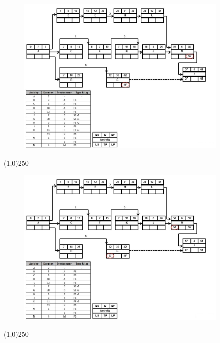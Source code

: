 \begin{frame}
\begin{figure}
	\centering
		\includegraphics[width = 10.0cm]{oldnotes/Slide222.jpg}
\end{figure}
\end{frame}
\begin{center}\line(1,0){250}\end{center}




\begin{frame}
\begin{figure}
	\centering
		\includegraphics[width = 10.0cm]{oldnotes/Slide223.jpg}
\end{figure}
\end{frame}
\begin{center}\line(1,0){250}\end{center}




